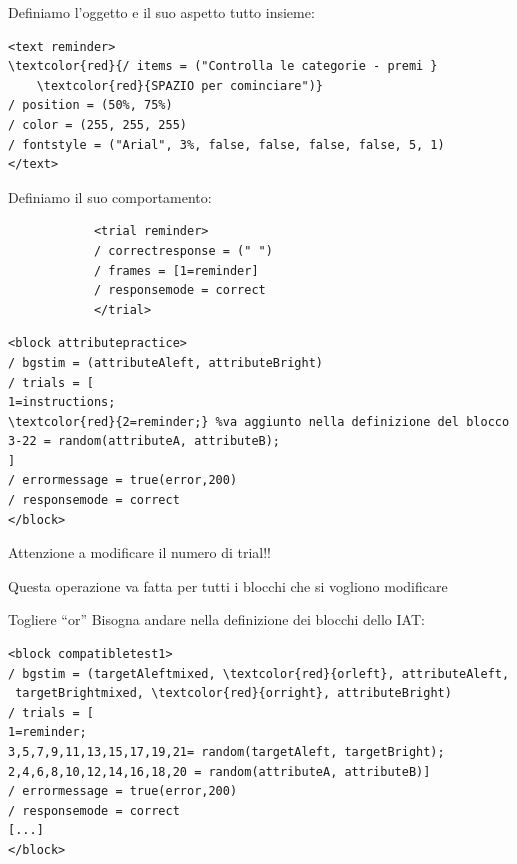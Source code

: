 \documentclass{beamer}
\begin{document}
\begin{frame}[fragile]
	Definiamo l'oggetto e il suo aspetto tutto insieme:
		\begin{small}
\begin{Verbatim}[commandchars=\\\{\}]
<text reminder>
\textcolor{red}{/ items = ("Controlla le categorie - premi }
	\textcolor{red}{SPAZIO per cominciare")}
/ position = (50%, 75%) 
/ color = (255, 255, 255)
/ fontstyle = ("Arial", 3%, false, false, false, false, 5, 1)
</text>
\end{Verbatim}
	\end{small}

Definiamo il suo comportamento:
	\begin{small}
		\begin{verbatim}
			<trial reminder> 
			/ correctresponse = (" ") 
			/ frames = [1=reminder] 
			/ responsemode = correct 
			</trial>
		\end{verbatim}
	\end{small}
\end{frame}

\begin{frame}[fragile]

\begin{Verbatim}[commandchars=\\\{\}]
<block attributepractice>
/ bgstim = (attributeAleft, attributeBright)
/ trials = [
1=instructions;
\textcolor{red}{2=reminder;} %va aggiunto nella definizione del blocco
3-22 = random(attributeA, attributeB);
]
/ errormessage = true(error,200)
/ responsemode = correct
</block>
	\end{Verbatim}
Attenzione a modificare il numero di trial!!

Questa operazione va fatta per tutti i blocchi che si vogliono modificare
\end{frame}

\begin{frame}[fragile]{Togliere ``or''}
	Bisogna andare nella definizione dei blocchi dello IAT: 
	\begin{small}
		\begin{Verbatim}[commandchars=\\\{\}]
<block compatibletest1>
/ bgstim = (targetAleftmixed, \textcolor{red}{orleft}, attributeAleft,
 targetBrightmixed, \textcolor{red}{orright}, attributeBright)
/ trials = [
1=reminder;
3,5,7,9,11,13,15,17,19,21= random(targetAleft, targetBright);
2,4,6,8,10,12,14,16,18,20 = random(attributeA, attributeB)]
/ errormessage = true(error,200)
/ responsemode = correct
[...]
</block>
		\end{Verbatim}
	\end{small}
\end{frame}
\end{document}
